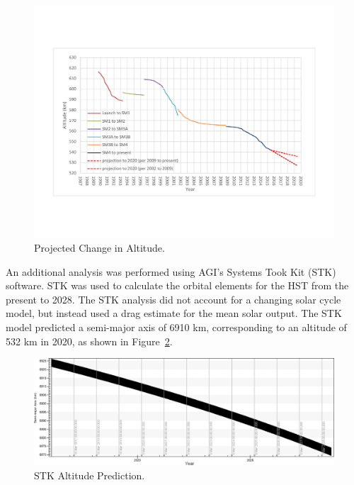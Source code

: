\documentclass[paper=letter, fontsize=11pt]{scrartcl} %
\numberwithin{equation}{section} %
\numberwithin{figure}{section} %
\numberwithin{table}{section} %
\begin{document}
\begin{figure}[H]
\begin{center}
\includegraphics[width=1\textwidth]{figs2/4.pdf}
\caption{Projected Change in Altitude.}
\label{fig:fig4}
\end{center}
\end{figure}

An additional analysis was performed using AGI's Systems Took Kit (STK) software. STK was used to calculate the orbital elements for the HST from the present to 2028. The STK analysis did not account for a changing solar cycle model, but instead used a drag estimate for the mean solar output. The STK model predicted a semi-major axis of 6910 km, corresponding to an altitude of 532 km in 2020, as shown in Figure~\ref{fig:fig5}.

\begin{figure}[H]
\begin{center}
\includegraphics[width=1\textwidth]{figs2/5.png}
\caption{STK Altitude Prediction.}
\label{fig:fig5}
\end{center}
\end{figure}
\end{document}

